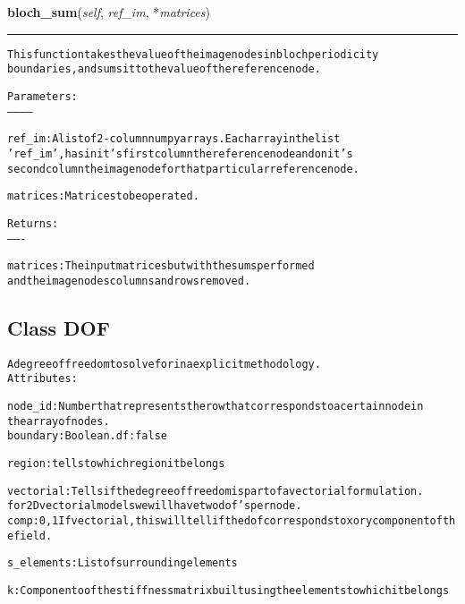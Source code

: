\hspace{.8\funcindent}\begin{boxedminipage}{\funcwidth}

    \raggedright \textbf{bloch\_sum}(\textit{self}, \textit{ref\_im}, *\textit{matrices})

    \vspace{-1.5ex}

    \rule{\textwidth}{0.5\fboxrule}
\setlength{\parskip}{2ex}
\begin{alltt}

This function takes the value of the image nodes in bloch periodicity 
boundaries, and sums it to the value of the reference node.

Parameters:
-----------

ref\_im:    A list of 2-column numpy arrays. Each array in the list 
            'ref\_im', has in it's first column the reference node and on it's 
            second column the image node for that particular reference node.

    
matrices:  Matrices to be operated.

Returns:
-------

matrices:  The input matrices but with the sums performed 
           and the image nodes columns and rows removed. 
\end{alltt}

\setlength{\parskip}{1ex}
    \end{boxedminipage}



\subsection{Class DOF}

    \label{Classes:DOF}
\begin{alltt}

A degree of freedom to solve for in a explicit methodology.
Attributes:

node\_id:        Number that represents the row that corresponds to a certain node in 
                        the array of nodes.
boundary:  Boolean. df: false

region:  tells to which region it belongs

vectorial: Tells if the degree of freedom is part of a vectorial formulation.
                   for 2D vectorial models we will have two dof's per node.
comp:  0,1   If vectorial, this will tell if the dof corresponds to x or y component of the field.      

s\_elements:  List of surrounding elements 

k:              Componento of the stiffness matrix built using the elements to which it belongs
\end{alltt}


